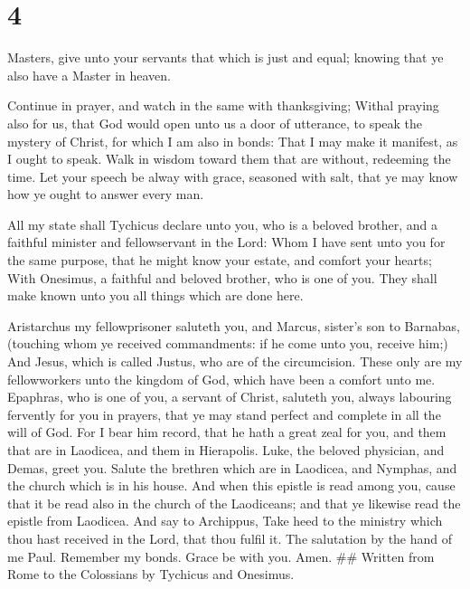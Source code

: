 \hypertarget{section-3}{%
\section{4}\label{section-3}}

 Masters, give unto your servants that which is just and
equal; knowing that ye also have a Master in heaven.

 Continue in prayer, and watch in the same with
thanksgiving;  Withal praying also for us, that God would
open unto us a door of utterance, to speak the mystery of Christ, for
which I am also in bonds:  That I may make it manifest, as I
ought to speak.  Walk in wisdom toward them that are
without, redeeming the time.  Let your speech be alway with
grace, seasoned with salt, that ye may know how ye ought to answer every
man.

 All my state shall Tychicus declare unto you, who is a
beloved brother, and a faithful minister and fellowservant in the Lord:
 Whom I have sent unto you for the same purpose, that he
might know your estate, and comfort your hearts;  With
Onesimus, a faithful and beloved brother, who is one of you. They shall
make known unto you all things which are done here.

 Aristarchus my fellowprisoner saluteth you, and Marcus,
sister's son to Barnabas, (touching whom ye received commandments: if he
come unto you, receive him;)  And Jesus, which is called
Justus, who are of the circumcision. These only are my fellowworkers
unto the kingdom of God, which have been a comfort unto me.
 Epaphras, who is one of you, a servant of Christ, saluteth
you, always labouring fervently for you in prayers, that ye may stand
perfect and complete in all the will of God.  For I bear
him record, that he hath a great zeal for you, and them that are in
Laodicea, and them in Hierapolis.  Luke, the beloved
physician, and Demas, greet you.  Salute the brethren which
are in Laodicea, and Nymphas, and the church which is in his house.
 And when this epistle is read among you, cause that it be
read also in the church of the Laodiceans; and that ye likewise read the
epistle from Laodicea.  And say to Archippus, Take heed to
the ministry which thou hast received in the Lord, that thou fulfil it.
 The salutation by the hand of me Paul. Remember my bonds.
Grace be with you. Amen. \#\# Written from Rome to the Colossians by
Tychicus and Onesimus.
